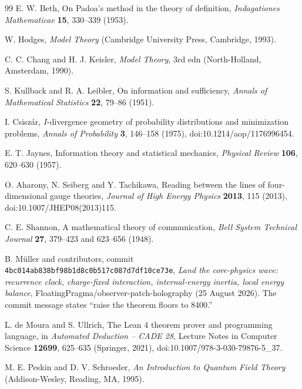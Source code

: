 \documentclass[10pt,a4paper]{article}
\theoremstyle{definition}
\theoremstyle{remark}
\begin{document}
\begin{thebibliography}{99}
E. W. Beth, On Padoa's method in the theory of definition,
\emph{Indagationes Mathematicae} \textbf{15}, 330--339 (1953).

W. Hodges, \emph{Model Theory} (Cambridge University Press, Cambridge, 1993).

C. C. Chang and H. J. Keisler, \emph{Model Theory}, 3rd edn
(North-Holland, Amsterdam, 1990).

S. Kullback and R. A. Leibler, On information and sufficiency,
\emph{Annals of Mathematical Statistics} \textbf{22}, 79--86 (1951).

I. Csisz\'ar, \(I\)-divergence geometry of probability distributions and
minimization problems, \emph{Annals of Probability} \textbf{3}, 146--158
(1975), doi:10.1214/aop/1176996454.

E. T. Jaynes, Information theory and statistical mechanics,
\emph{Physical Review} \textbf{106}, 620--630 (1957).

O. Aharony, N. Seiberg and Y. Tachikawa, Reading between the lines of
four-dimensional gauge theories, \emph{Journal of High Energy Physics}
\textbf{2013}, 115 (2013), doi:10.1007/JHEP08(2013)115.


C. E. Shannon, A mathematical theory of communication,
\emph{Bell System Technical Journal} \textbf{27}, 379--423 and 623--656
(1948).

B. M\"uller and contributors, commit
\texttt{4bc014ab838bf98b1d8c0b517c087d7df10ce73e},
\emph{Land the core-physics wave: recurrence clock, charge-fixed interaction,
internal-energy inertia, local energy balance},
FloatingPragma/observer-patch-holography (25 August 2026).  The commit message
states ``raise the theorem floors to 8400.''

L. de Moura and S. Ullrich, The Lean 4 theorem prover and programming
language, in \emph{Automated Deduction -- CADE 28}, Lecture Notes in Computer
Science \textbf{12699}, 625--635 (Springer, 2021),
doi:10.1007/978-3-030-79876-5\_37.

M. E. Peskin and D. V. Schroeder, \emph{An Introduction to Quantum Field
Theory} (Addison-Wesley, Reading, MA, 1995).

\end{thebibliography}
\end{document}
